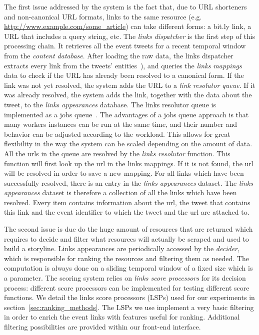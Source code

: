 \documentclass{sig-alternate-somus}
\begin{document}
The first issue addressed by the system is the fact that, due to URL shorteners and non-canonical URL formats, links to the same resource (e.g. \url{http://www.example.com/some\_article}) can take different forms: a bit.ly link, a URL that includes a query string, etc. The \emph{links dispatcher} is the first step of this processing chain. It retrieves all the event tweets for a recent temporal window from the \emph{content database}. After loading the raw data, the links dispatcher extracts every link from the tweets' entities~\cite{RestTweetsDoc}), and queries the \emph{links mappings} data to check if the URL has already been resolved to a canonical form. If the link was not yet resolved, the system adds the URL to a \emph{link resolutor queue}. If it was already resolved, the system adds the link, together with the data about the tweet, to the \emph{links appearances} database. The links resolutor queue is implemented as a jobs queue~\cite{RedisQueues}. The advantages of a jobs queue approach is that many workers instances can be run at the same time, and their number and behavior can be adjusted according to the workload. This allows for great flexibility in the way the system can be scaled depending on the amount of data. All the urls in the queue are resolved by the \emph{links resolutor} function. This function will first look up the url in the links mappings. If it is not found, the url will be resolved in order to save a new mapping. For all links which have been successfully resolved, there is an entry in the \emph{links appearances} dataset. The \emph{links appearances} dataset is therefore a collection of all the links which have been resolved. Every item contains information about the url, the tweet that contains this link and the event identifier to which the tweet and the url are attached to.

The second issue is due do the huge amount of resources that are returned which requires to decide and filter what resources will actually be scraped and used to build a storyline. Links appearances are periodically accessed by the \emph{decider}, which is responsible for ranking the resources and filtering them as needed. The computation is always done on a sliding temporal window of a fixed size which is a parameter. The scoring system relies on \emph{links score processors} for its decision process: different score processors can be implemented for testing different score functions. We detail the links score processors (LSPs) used for our experiments in section~\ref{sec:ranking_methods}. The LSPs we use implement a very basic filtering in order to enrich the event links with features useful for ranking. Additional filtering possibilities are provided within our front-end interface.
\end{document}
